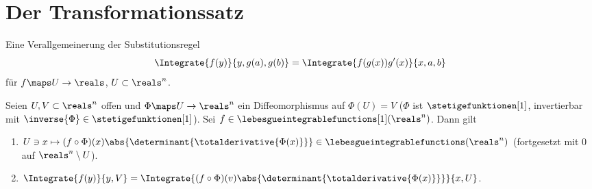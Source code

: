 \section{Der Transformationssatz}
\begin{ziel*}
  Eine Verallgemeinerung der Substitutionsregel
  \begin{equation*}
    \Integrate{f(y)}{y,g(a),g(b)}=\Integrate{f(g(x))g'(x)}{x,a,b}
  \end{equation*}
  für \( f\maps U\to \reals \), \( U\subset \reals^n \).
\end{ziel*}
\begin{satz}[Transformationssatz]\label{transformationssatz}
  Seien \( U,V\subset \reals^n \) offen und \( \Phi\maps U\to \reals^n \) ein Diffeomorphismus auf \( \Phi(U)=V \) (\dh \( \Phi \) ist \( \stetigefunktionen[1] \), invertierbar mit \( \inverse{\Phi}\in \stetigefunktionen[1] \)). Sei \( f\in \lebesgueintegrablefunctions[1](\reals^n) \). Dann gilt
  \begin{enumerate}
    \item \( U\ni x\mapsto (f\circ \Phi)(x)\abs{\determinant{{\totalderivative{\Phi(x)}}}}\in \lebesgueintegrablefunctions(\reals^n) \) (fortgesetzt mit \( 0 \) auf \( \reals^n\setminus U \)).
    \item \( \Integrate{f(y)}{y,V}=\Integrate{(f\circ \Phi)(v)\abs{\determinant{\totalderivative{\Phi(x)}}}}{x,U} \).
  \end{enumerate}
\end{satz}
